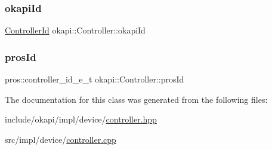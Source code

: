 \subsubsection{\texorpdfstring{okapiId}{okapiId}}
{\footnotesize\ttfamily \mbox{\hyperlink{namespaceokapi_a56349a0562b06c6ffc742e94cb1e4361}{Controller\+Id}} okapi\+::\+Controller\+::okapi\+Id\hspace{0.3cm}{\ttfamily [protected]}}

\mbox{\label{classokapi_1_1Controller_a3580b65b5bfe23f055d8174dd7b5b5bb}} 
\subsubsection{\texorpdfstring{prosId}{prosId}}
{\footnotesize\ttfamily pros\+::controller\+\_\+id\+\_\+e\+\_\+t okapi\+::\+Controller\+::pros\+Id\hspace{0.3cm}{\ttfamily [protected]}}



The documentation for this class was generated from the following files\+:\begin{DoxyCompactItemize}
\item 
include/okapi/impl/device/\mbox{\hyperlink{controller_8hpp}{controller.\+hpp}}\item 
src/impl/device/\mbox{\hyperlink{controller_8cpp}{controller.\+cpp}}\end{DoxyCompactItemize}
